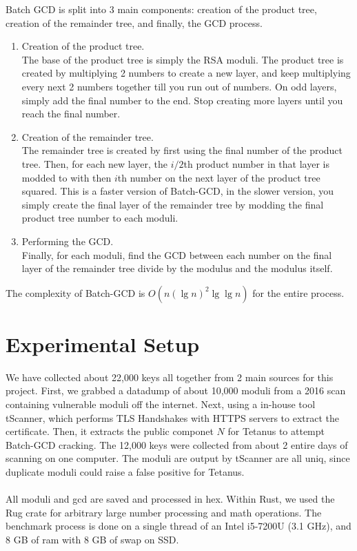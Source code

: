 \documentclass[10pt, letterpaper]{article}
\begin{document}
Batch GCD is split into 3 main components: creation of the product tree, creation of the remainder tree, and finally, the GCD process.

\begin{enumerate}
\item Creation of the product tree. \\
  The base of the product tree is simply the RSA moduli. The product tree is created by multiplying 2 numbers to create a new layer, and keep multiplying every next 2 numbers together till you run out of numbers. On odd layers, simply add the final number to the end. Stop creating more layers until you reach the final number.
\item Creation of the remainder tree. \\
  The remainder tree is created by first using the final number of the product tree. Then, for each new layer, the $i/2$th product number in that layer is modded to with then $i$th number on the next layer of the product tree squared. This is a faster version of Batch-GCD, in the slower version, you simply create the final layer of the remainder tree by modding the final product tree number to each moduli.
\item Performing the GCD. \\
  Finally, for each moduli, find the GCD between each number on the final layer of the remainder tree divide by the modulus and the modulus itself.
\end{enumerate}

The complexity of Batch-GCD is $O(n(\lg{n})^2 \lg{\lg{n}})$ for the entire process.

\section{Experimental Setup}
We have collected about 22,000 keys all together from 2 main sources for this project. First, we grabbed a datadump of about 10,000 moduli from a 2016 scan containing vulnerable moduli off the internet. Next, using a in-house tool tScanner, which performs TLS Handshakes with HTTPS servers to extract the certificate. Then, it extracts the public componet $N$ for Tetanus to attempt Batch-GCD cracking. The 12,000 keys were collected from about 2 entire days of scanning on one computer. The moduli are output by tScanner are all uniq, since duplicate moduli could raise a false positive for Tetanus.\\
\\
All moduli and gcd are saved and processed in hex. Within Rust, we used the Rug crate for arbitrary large number processing and math operations. The benchmark process is done on a single thread of an Intel i5-7200U (3.1 GHz), and 8 GB of ram with 8 GB of swap on SSD. 
\end{document}
